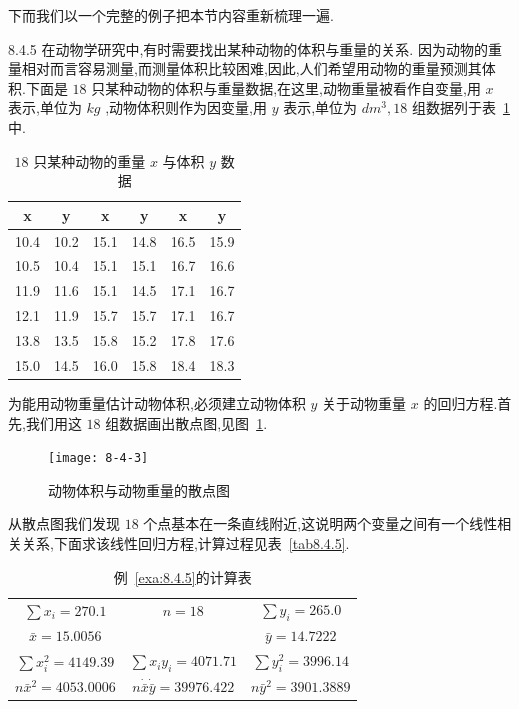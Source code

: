 下而我们以一个完整的例子把本节内容重新梳理一遍.
\begin{example}{}{8.4.5}
	在动物学研究中,有时需要找出某种动物的体积与重量的关系.
	因为动物的重量相对而言容易测量,而测量体积比较困难,因此,人们希望用动物的重量预测其体积.下面是 $ 18 $ 只某种动物的体积与重量数据,在这里,动物重量被看作自变量,用 $ x $ 表示,单位为 $ kg $ ,动物体积则作为因变量,用 $ y $ 表示,单位为 $ dm^3,18 $ 组数据列于表~\ref{tab:8.4.4}中.
	\begin{table}[htbp]
		\centering
		\caption{ $ 18 $ 只某种动物的重量 $ x $ 与体积 $ y $ 数据}
		\begin{tabular}{cc||cc||cc}
			\toprule
			x     & y     & x     & y     & x     & y \\\midrule
			10.4  & 10.2  & 15.1  & 14.8  & 16.5  & 15.9  \\
			10.5  & 10.4  & 15.1  & 15.1  & 16.7  & 16.6  \\
			11.9  & 11.6  & 15.1  & 14.5  & 17.1  & 16.7  \\
			12.1  & 11.9  & 15.7  & 15.7  & 17.1  & 16.7  \\
			13.8  & 13.5  & 15.8  & 15.2  & 17.8  & 17.6  \\
			15.0  & 14.5  & 16.0  & 15.8  & 18.4  & 18.3  \\\bottomrule
		\end{tabular}%
		\label{tab:8.4.4}%
	\end{table}%
	为能用动物重量估计动物体积,必须建立动物体积 $ y $ 关于动物重量 $ x $ 的回归方程.首先,我们用这 $ 18 $ 组数据画出散点图,见图~\ref{fig:8.4.3}.
	\begin{figure}[!htb]
		\centering
		\texttt{[image: 8-4-3]}
		\caption{动物体积与动物重量的散点图}
		\label{fig:8.4.3}
	\end{figure}
	从散点图我们发现 $ 18 $ 个点基本在一条直线附近,这说明两个变量之间有一个线性相关关系,下面求该线性回归方程,计算过程见表~\ref{tab8.4.5}.
	\begin{table}[htbp]
		\centering
		\caption{例~\ref{exa:8.4.5}的计算表}
		\begin{tabular}{ccc}
			$ \sum x_i=270.1 $ 	&    $ n=18 $     &  $ \sum y_i=265.0 $  \\
			$ \bar{x}=15.0056 $ 	&       &  $ \bar{y}=14.7222 $  \\
			$ \sum x_{i}^{2}=4149.39 $ 	&    $ \sum x_iy_i=4071.71 $     &  $ \sum y_{i}^{2}=3996.14 $  \\
			$ n\bar{x}^2=4053.0006 $ 	&    $ n\dot \bar{x}\dot \bar{y}=39976.422 $     &  $ n\bar{y}^2=3901.3889 $  \\

\end{tabular}
\end{table}
\end{example}
